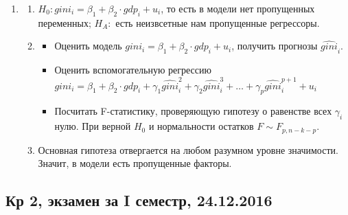 \documentclass[12pt, a4paper]{article}
\begin{document}
\begin{enumerate}
\item
\begin{enumerate}
\item $H_0: gini_i = \beta_1 + \beta_2 \cdot gdp_i + u_i$, то есть в модели нет пропущенных переменных; $H_A:$ есть неизвсетные нам пропущенные регрессоры.
\item
\begin{itemize}
\item Оценить модель $gini_i = \beta_1 + \beta_2 \cdot gdp_i + u_i$, получить прогнозы $\widehat{gini}_i$.
\item Оценить вспомогательную регрессию $gini_i = \beta_1 + \beta_2 \cdot gdp_i + \gamma_1 \widehat{gini}_i^2 + \gamma_2 \widehat{gini}_i^3 + \ldots + \gamma_p \widehat{gini}_i^{p+1} + u_i$
\item Посчитать F-статистику, проверяющую гипотезу о равенстве всех $\gamma_i$ нулю. При верной $H_0$ и нормальности остатков $F \sim F_{p, n-k-p}$.
\end{itemize}
\item Основная гипотеза отвергается на любом разумном уровне значимости. Значит, в модели есть пропущенные факторы.
\end{enumerate}
\end{enumerate}



\subsection{Кр 2, экзамен за I семестр, 24.12.2016}



\end{document}
